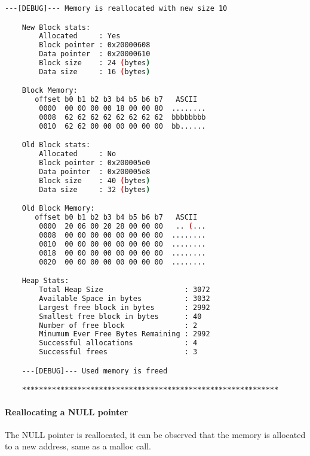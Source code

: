     \begin{outputbox}
    \begin{lstlisting}[language=bash]
    ---[DEBUG]--- Memory is reallocated with new size 10

    New Block stats:
        Allocated     : Yes
        Block pointer : 0x20000608
        Data pointer  : 0x20000610
        Block size    : 24 (bytes)
        Data size     : 16 (bytes)

    Block Memory:
       offset b0 b1 b2 b3 b4 b5 b6 b7   ASCII
        0000  00 00 00 00 18 00 00 80  ........
        0008  62 62 62 62 62 62 62 62  bbbbbbbb
        0010  62 62 00 00 00 00 00 00  bb......

    Old Block stats:
        Allocated     : No
        Block pointer : 0x200005e0
        Data pointer  : 0x200005e8
        Block size    : 40 (bytes)
        Data size     : 32 (bytes)

    Old Block Memory:
       offset b0 b1 b2 b3 b4 b5 b6 b7   ASCII
        0000  20 06 00 20 28 00 00 00   .. (...
        0008  00 00 00 00 00 00 00 00  ........
        0010  00 00 00 00 00 00 00 00  ........
        0018  00 00 00 00 00 00 00 00  ........
        0020  00 00 00 00 00 00 00 00  ........

    Heap Stats:
        Total Heap Size                   : 3072
        Available Space in bytes          : 3032
        Largest free block in bytes       : 2992
        Smallest free block in bytes      : 40
        Number of free block              : 2
        Minumum Ever Free Bytes Remaining : 2992
        Successful allocations            : 4
        Successful frees                  : 3

    ---[DEBUG]--- Used memory is freed

    ************************************************************
    \end{lstlisting}
    \end{outputbox}

    \paragraph{Reallocating a NULL pointer}
    The NULL pointer is reallocated, it can be observed that the memory is allocated to a new address, same as a malloc call.

